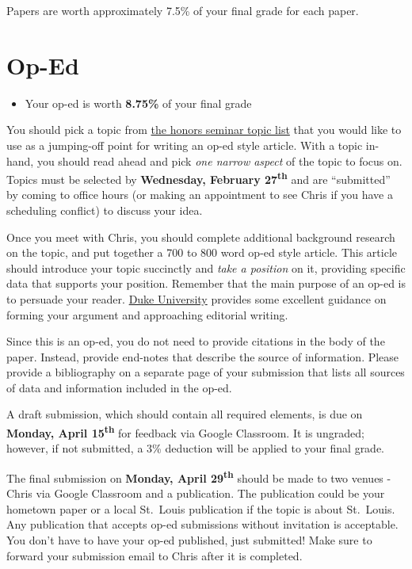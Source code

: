 \documentclass[]{book}
\newenvironment{rmdblock}[1]
  {\begin{shaded*}
  \begin{itemize}
  \renewcommand{\labelitemi}{
    \raisebox{-.7\height}[0pt][0pt]{
      {\setkeys{Gin}{width=3em,keepaspectratio}\texttt{[image: images/\#1]}}
    }
  }
  \item
  }
  {
  \end{itemize}
  \end{shaded*}
  }
\newenvironment{rmdtip}
  {\begin{rmdblock}{tip}}
  {\end{rmdblock}}
\begin{document}
Papers are worth approximately 7.5\% of your final grade for each paper.

\hypertarget{op-ed}{%
\section{Op-Ed}\label{op-ed}}

\begin{rmdtip}
Your op-ed is worth \textbf{8.75\%} of your final grade
\end{rmdtip}

You should pick a topic from \href{/honors-seminar-topics.html}{the honors seminar topic list} that you would like to use as a jumping-off point for writing an op-ed style article. With a topic in-hand, you should read ahead and pick \emph{one narrow aspect} of the topic to focus on. Topics must be selected by \textbf{Wednesday, February 27\textsuperscript{th}} and are ``submitted'' by coming to office hours (or making an appointment to see Chris if you have a scheduling conflict) to discuss your idea.

Once you meet with Chris, you should complete additional background research on the topic, and put together a 700 to 800 word op-ed style article. This article should introduce your topic succinctly and \emph{take a position} on it, providing specific data that supports your position. Remember that the main purpose of an op-ed is to persuade your reader. \href{https://styleguide.duke.edu/toolkits/writing-media/how-to-write-an-op-ed-article/}{Duke University} provides some excellent guidance on forming your argument and approaching editorial writing.

Since this is an op-ed, you do not need to provide citations in the body of the paper. Instead, provide end-notes that describe the source of information. Please provide a bibliography on a separate page of your submission that lists all sources of data and information included in the op-ed.

A draft submission, which should contain all required elements, is due on \textbf{Monday, April 15\textsuperscript{th}} for feedback via Google Classroom. It is ungraded; however, if not submitted, a 3\% deduction will be applied to your final grade.

The final submission on \textbf{Monday, April 29\textsuperscript{th}} should be made to two venues - Chris via Google Classroom and a publication. The publication could be your hometown paper or a local St.~Louis publication if the topic is about St.~Louis. Any publication that accepts op-ed submissions without invitation is acceptable. You don't have to have your op-ed published, just submitted! Make sure to forward your submission email to Chris after it is completed.
\end{document}

